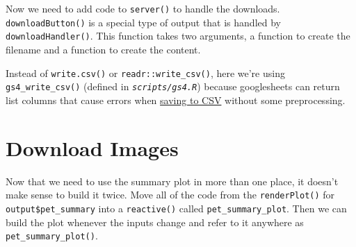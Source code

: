 \documentclass[
  oneside]{book}
\newenvironment{Shaded}{\begin{snugshade}}{\end{snugshade}}
\newcommand{\AttributeTok}[1]{\textcolor[rgb]{0.77,0.63,0.00}{#1}}
\newcommand{\ControlFlowTok}[1]{\textcolor[rgb]{0.13,0.29,0.53}{\textbf{#1}}}
\newcommand{\DocumentationTok}[1]{\textcolor[rgb]{0.56,0.35,0.01}{\textbf{\textit{#1}}}}
\newcommand{\FunctionTok}[1]{\textcolor[rgb]{0.00,0.00,0.00}{#1}}
\newcommand{\NormalTok}[1]{#1}
\newcommand{\OtherTok}[1]{\textcolor[rgb]{0.56,0.35,0.01}{#1}}
\newcommand{\SpecialCharTok}[1]{\textcolor[rgb]{0.00,0.00,0.00}{#1}}
\newcommand{\StringTok}[1]{\textcolor[rgb]{0.31,0.60,0.02}{#1}}
\begin{document}
Now we need to add code to \texttt{server}\texttt{()} to handle the downloads. \texttt{downloadButton}\texttt{()} is a special type of output that is handled by \texttt{downloadHandler}\texttt{()}. This function takes two arguments, a function to create the \AttributeTok{filename} and a function to create the \AttributeTok{content}.

\begin{Shaded}
\end{Shaded}

\begin{warning}
Instead of \texttt{write.csv}\texttt{()} or \texttt{readr::write\_csv}\texttt{()}, here we're using \texttt{gs4\_write\_csv}\texttt{()} (defined in \textit{\texttt{scripts/gs4.R}}) because googlesheets can return list columns that cause errors when \protect\hyperlink{gs4_save}{saving to CSV} without some preprocessing.

\end{warning}

\hypertarget{download-images}{%
\section{Download Images}\label{download-images}}

Now that we need to use the summary plot in more than one place, it doesn't make sense to build it twice. Move all of the code from the \texttt{renderPlot}\texttt{()} for \texttt{output\$pet\_summary} into a \texttt{reactive}\texttt{()} called \texttt{pet\_summary\_plot}. Then we can build the plot whenever the inputs change and refer to it anywhere as \texttt{pet\_summary\_plot}\texttt{()}.
\end{document}
